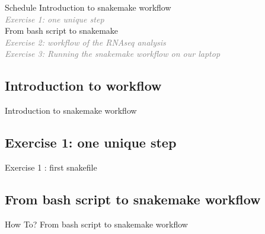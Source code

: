 
\begin{frame}{Schedule}
Introduction to snakemake workflow\\
\quad \quad \textcolor{gray}{\it Exercise 1: one unique step}\\
From bash script to snakemake\\
\quad \quad \textcolor{gray}{\it Exercise 2: workflow of the RNAseq analysis}\\
\quad \quad \textcolor{gray}{\it Exercise 3: Running the snakemake workflow on our laptop}\\
\end{frame}


%
%

\subsection[WorkflowIntro]{Introduction to workflow}
\begin{frame}{}
    \huge{Introduction to snakemake workflow}
\end{frame}

\subsection[SnakemakeEx1]{Exercise 1: one unique step}
\begin{frame}{}
    \huge{Exercise 1 : first snakefile}
\end{frame}

\subsection[bash2snakemake]{From bash script to snakemake workflow}
\begin{frame}{How To?}
    \huge{From bash script to snakemake workflow}
\end{frame}

